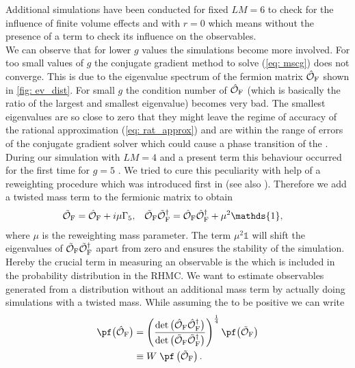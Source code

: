 Additional simulations have been conducted for fixed $LM=6$ to check for the influence of finite volume effects and with $r=0$ which means without the presence of a  term to check its influence on the observables.\\
We can observe that for lower $g$ values the simulations become more involved. For too small values of $g$ the conjugate gradient method to solve (\ref{eq: mscg}) does not converge. This is due to the eigenvalue spectrum of the fermion matrix $\hat{\mathcal{O}}_{\rm F}$ shown in \autoref{fig: ev_dist}. For small $g$ the condition number of $\hat{\mathcal{O}}_{\rm F}$ (which is basically the ratio of the largest and smallest eigenvalue) becomes very bad. The smallest eigenvalues are so close to zero that they might leave the regime of accuracy of the rational approximation (\ref{eq: rat_approx}) and are within the range of errors of the conjugate gradient solver which could cause a phase transition of the . During our simulation with $LM=4$ and a present  term this behaviour occurred for the first time for $g=5$ . We tried to cure this peculiarity with help of a reweighting procedure which was introduced first in \cite{Ferrenberg:1988yz} (see also \cite{Luscher:2008tw,Finkenrath:2013soa}). Therefore we add a twisted mass term to the fermionic matrix to obtain
%
%
\begin{align}
\tilde{\mathcal{O}}_{\rm F} &= \hat{\mathcal{O}}_{\rm F} + i\mu \Gamma_{5},  &
\tilde{\mathcal{O}}_{\rm F} \tilde{\mathcal{O}}_{\rm F}^{\dagger} &= \hat{\mathcal{O}}_{\rm F}\hat{\mathcal{O}}_{\rm F}^{\dagger} + \mu^{2}\mathds{1},
\end{align}
%
%
where $\mu$ is the reweighting mass parameter. The term $\mu^{2}\mathds{1}$ will shift the eigenvalues of $\tilde{\mathcal{O}}_{\rm F} \tilde{\mathcal{O}}_{\rm F}^{\dagger}$ apart from zero and ensures the stability of the simulation. Hereby the crucial term in measuring an observable is the  which is included in the probability distribution in the RHMC. We want to estimate observables generated from a distribution without an additional mass term by actually doing simulations with a twisted mass. While assuming the  to be positive we can write
%
%
\begin{equation}
\begin{alignedat}{2}
\pf\big(\hat{\mathcal{O}}_{\rm F}\big) &= \left(\frac{\det \big(\hat{\mathcal{O}}_{\rm F} \hat{\mathcal{O}}_{\rm F}^{\dagger} \big)}{\det \big(\tilde{\mathcal{O}}_{\rm F} \tilde{\mathcal{O}}_{\rm F}^{\dagger} \big)}\right)^{\frac{1}{4}} \pf\big(\tilde{\mathcal{O}}_{\rm F}\big)\\
%
&\equiv W \;\pf\left(\tilde{\mathcal{O}}_{\rm F}\right).
\end{alignedat}
\label{eq: rew_factor}
\end{equation}
